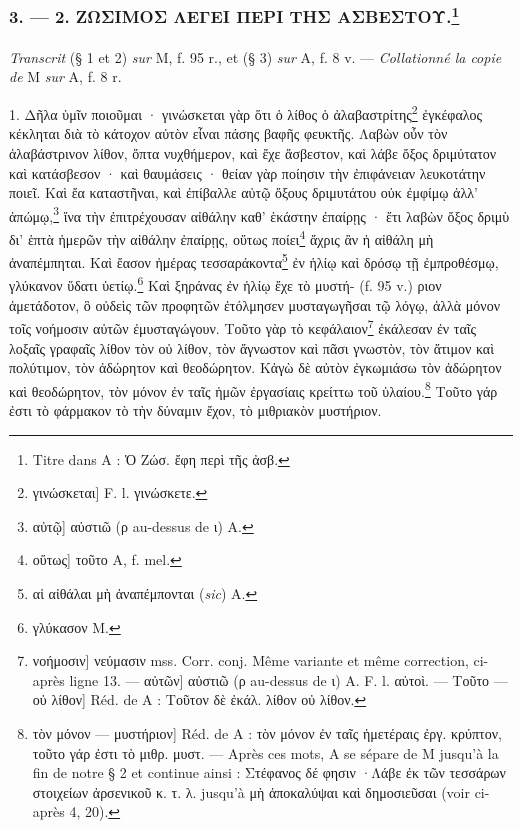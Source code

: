 \documentclass[landscape, a4paper, 11pt, oneside, polutonikogreek, french]{article}
\begin{document}
\bigskip
\centerline{\EightStarTaper}
\centerline{\EightStarTaper\EightStarTaper}
\bigskip

\subsubsection[3. --- 2. ΖΩΣΙΜΟΣ ΛΕΓΕΙ ΠΕΡΙ ΤΗΣ ΑΣΒΕΣΤΟΥ.]{3. --- 2. ΖΩΣΙΜΟΣ ΛΕΓΕΙ ΠΕΡΙ ΤΗΣ ΑΣΒΕΣΤΟΥ.\footnote{Titre dans A : Ὁ Ζώσ. ἔφη περὶ τῆς ἀσβ.}}
\paragraph{}
\emph{Transcrit} (§ 1 et 2) \emph{sur} M, f. 95 r., et (§ 3) \emph{sur} A, f. 8 v. --- \emph{Collationné la copie de} M \emph{sur} A, f. 8 r.

\bigskip

1. Δῆλα ὑμῖν ποιοῦμαι · γινώσκεται γὰρ ὅτι ὁ λίθος ὁ ἀλαβαστρίτης\footnote{γινώσκεται] F. l. γινώσκετε.} ἐγκέφαλος κέκληται διὰ τὸ κάτοχον αὐτὸν εἶναι πάσης βαφῆς φευκτῆς. Λαβὼν οὖν τὸν ἀλαβάστρινον λίθον, ὄπτα νυχθήμερον, καὶ ἔχε ἄσβεστον, καὶ λάβε ὄξος δριμύτατον καὶ κατάσβεσον · καὶ θαυμάσεις · θείαν γὰρ ποίησιν τὴν ἐπιφάνειαν λευκοτάτην ποιεῖ. Καὶ ἔα καταστῆναι, καὶ ἐπίβαλλε αὐτῷ ὄξους δριμυτάτου οὐκ ἐμφίμῳ ἀλλ' ἀπώμῳ,\footnote{αὐτῷ] αὐστιῶ (ρ au-dessus de ι) A.} ἵνα τὴν ἐπιτρέχουσαν αἰθάλην καθ' ἑκάστην ἐπαίρῃς · ἔτι λαβὼν ὄξος δριμὺ δι' ἑπτὰ ἡμερῶν τὴν αἰθάλην ἐπαίρῃς, οὕτως ποίει\footnote{οὕτως] τοῦτο A, f. mel.} ἄχρις ἂν ἡ αἰθάλη μὴ ἀναπέμπηται. Καὶ ἔασον ἡμέρας τεσσαράκοντα\footnote{αἱ αἰθάλαι μὴ ἀναπέμπονται (\emph{sic}) A.} ἐν ἡλίῳ καὶ δρόσῳ τῇ ἐμπροθέσμῳ, γλύκανον ὕδατι ὑετίῳ.\footnote{γλύκασον M.} Καὶ ξηράνας ἐν ἡλίῳ ἔχε τὸ μυστή- (f. 95 v.) ριον ἀμετάδοτον, ὃ οὐδεὶς τῶν προφητῶν ἐτόλμησεν μυσταγωγῆσαι τῷ λόγῳ, ἀλλὰ μόνον τοῖς νοήμοσιν αὐτῶν ἐμυσταγώγουν. Τοῦτο γὰρ τὸ κεφάλαιον\footnote{νοήμοσιν] νεύμασιν mss. Corr. conj. Même variante et même correction, ci-après ligne 13. --- αὐτῶν] αὐστιῶ (ρ au-dessus de ι) A. F. l. αὐτοὶ. --- Tοῦτο --- οὐ λίθον] Réd. de A : Τοῦτον δὲ ἐκάλ. λίθον οὐ λίθον.} ἐκάλεσαν ἐν ταῖς λοξαῖς γραφαῖς λίθον τὸν οὐ λίθον, τὸν ἄγνωστον καὶ πᾶσι γνωστὸν, τὸν ἄτιμον καὶ πολύτιμον, τὸν ἀδώρητον καὶ θεοδώρητον. Κἀγὼ δὲ αὐτὸν ἐγκωμιάσω τὸν ἀδώρητον καὶ θεοδώρητον, τὸν μόνον ἐν ταῖς ἡμῶν ἐργασίαις κρείττω τοῦ ὑλαίου.\footnote{τὸν μόνον --- μυστήριον] Réd. de A : τὸν μόνον ἐν ταῖς ἡμετέραις ἐργ. κρύπτον, τοῦτο γάρ ἐστι τὸ μιθρ. μυστ. --- Après ces mots, A se sépare de M jusqu'à la fin de notre § 2 et continue ainsi : Στέφανος δέ φησιν ·Λάβε ἐκ τῶν τεσσάρων στοιχείων ἀρσενικοῦ κ. τ. λ. jusqu'à μὴ ἀποκαλύψαι καὶ δημοσιεῦσαι (voir ci-après 4, 20).} Τοῦτο γάρ ἐστι τὸ φάρμακον τὸ τὴν δύναμιν ἔχον, τὸ μιθριακὸν μυστήριον.
\end{document}
